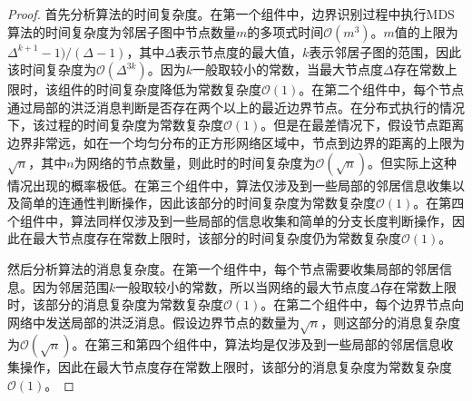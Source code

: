 \begin{proof}首先分析算法的时间复杂度。在第一个组件中，边界识别过程中执行MDS算法的时间复杂度为邻居子图中节点数量$m$的多项式时间$\mathcal{O}(m^3)$。$m$值的上限为$\Delta^{k+1}-1)/(\Delta-1)$，其中$\Delta$表示节点度的最大值，$k$表示邻居子图的范围，因此该时间复杂度为$\mathcal{O}(\Delta^{3k})$。因为$k$一般取较小的常数，当最大节点度$\Delta$存在常数上限时，该组件的时间复杂度降低为常数复杂度$\mathcal{O}(1)$。在第二个组件中，每个节点通过局部的洪泛消息判断是否存在两个以上的最近边界节点。在分布式执行的情况下，该过程的时间复杂度为常数复杂度$\mathcal{O}(1)$。但是在最差情况下，假设节点距离边界非常远，如在一个均匀分布的正方形网络区域中，节点到边界的距离的上限为$\sqrt{n}$，其中$n$为网络的节点数量，则此时的时间复杂度为$\mathcal{O}(\sqrt{n})$。但实际上这种情况出现的概率极低。在第三个组件中，算法仅涉及到一些局部的邻居信息收集以及简单的连通性判断操作，因此该部分的时间复杂度为常数复杂度$\mathcal{O}(1)$。在第四个组件中，算法同样仅涉及到一些局部的信息收集和简单的分支长度判断操作，因此在最大节点度存在常数上限时，该部分的时间复杂度仍为常数复杂度$\mathcal{O}(1)$。

然后分析算法的消息复杂度。在第一个组件中，每个节点需要收集局部的邻居信息。因为邻居范围$k$一般取较小的常数，所以当网络的最大节点度$\Delta$存在常数上限时，该部分的消息复杂度为常数复杂度$\mathcal{O}(1)$。在第二个组件中，每个边界节点向网络中发送局部的洪泛消息。假设边界节点的数量为$\sqrt{n}$，则这部分的消息复杂度为$\mathcal{O}(\sqrt{n})$。在第三和第四个组件中，算法均是仅涉及到一些局部的邻居信息收集操作，因此在最大节点度存在常数上限时，该部分的消息复杂度为常数复杂度$\mathcal{O}(1)$。
\end{proof}
